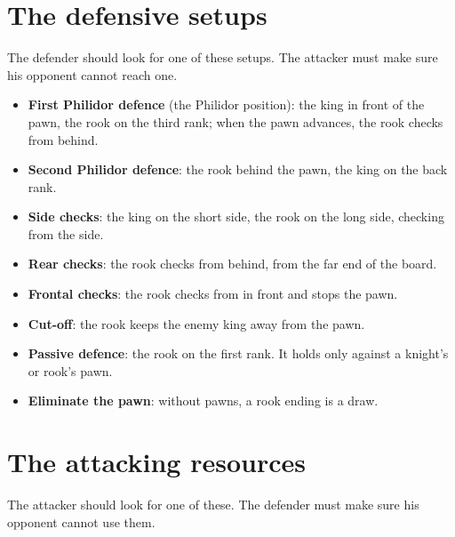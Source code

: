 
\section*{The defensive setups}
The defender should look for one of these setups. The attacker must make sure his opponent cannot
reach one.

\begin{itemize}
\item \textbf{First Philidor defence} (the Philidor position): the king in
front of the pawn, the rook on the third rank; when the pawn advances, the rook checks from behind.

\item \textbf{Second Philidor defence}: the rook behind the pawn,
the king on the back rank.

\item \textbf{Side checks}: the king on the
short side, the rook on the long side, checking from the side.

\item \textbf{Rear checks}: the rook checks from behind,
from the far end of the board.

\item \textbf{Frontal checks}: the rook checks
from in front and stops the pawn.

\item \textbf{Cut-off}: the rook keeps the enemy king away from
the pawn.

\item \textbf{Passive defence}: the rook on the
first rank. It holds only against a knight's or rook's pawn.

\item \textbf{Eliminate the pawn}: without
pawns, a rook ending is a draw.
\end{itemize}

\section*{The attacking resources}
The attacker should look for one of these. The defender must make sure his opponent cannot use them.

